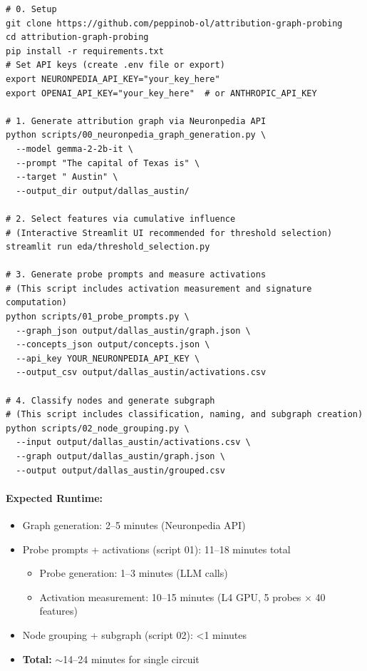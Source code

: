 \begin{verbatim}
# 0. Setup
git clone https://github.com/peppinob-ol/attribution-graph-probing
cd attribution-graph-probing
pip install -r requirements.txt
# Set API keys (create .env file or export)
export NEURONPEDIA_API_KEY="your_key_here"
export OPENAI_API_KEY="your_key_here"  # or ANTHROPIC_API_KEY

# 1. Generate attribution graph via Neuronpedia API
python scripts/00_neuronpedia_graph_generation.py \
  --model gemma-2-2b-it \
  --prompt "The capital of Texas is" \
  --target " Austin" \
  --output_dir output/dallas_austin/

# 2. Select features via cumulative influence
# (Interactive Streamlit UI recommended for threshold selection)
streamlit run eda/threshold_selection.py

# 3. Generate probe prompts and measure activations
# (This script includes activation measurement and signature computation)
python scripts/01_probe_prompts.py \
  --graph_json output/dallas_austin/graph.json \
  --concepts_json output/concepts.json \
  --api_key YOUR_NEURONPEDIA_API_KEY \
  --output_csv output/dallas_austin/activations.csv

# 4. Classify nodes and generate subgraph
# (This script includes classification, naming, and subgraph creation)
python scripts/02_node_grouping.py \
  --input output/dallas_austin/activations.csv \
  --graph output/dallas_austin/graph.json \
  --output output/dallas_austin/grouped.csv
\end{verbatim}

\paragraph{Expected Runtime:}
\begin{itemize}
  \item Graph generation: 2--5 minutes (Neuronpedia API)
  \item Probe prompts + activations (script 01): 11--18 minutes total
  \begin{itemize}
    \item Probe generation: 1--3 minutes (LLM calls)
    \item Activation measurement: 10--15 minutes (L4 GPU, 5 probes $\times$ 40 features)
  \end{itemize}
  \item Node grouping + subgraph (script 02): <1 minutes
  \item \textbf{Total:} $\sim$14--24 minutes for single circuit
\end{itemize}

